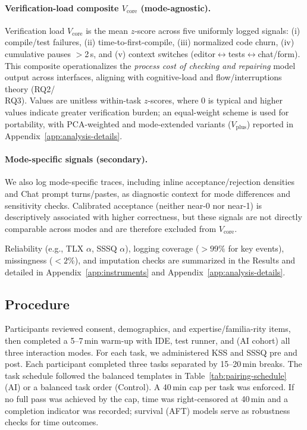 \documentclass[sigconf]{acmart}
\begin{document}
\paragraph{Verification-load composite $V_{\text{core}}$ (mode-agnostic).}
Verification load $V_{\text{core}}$ is the mean $z$-score across five uniformly logged signals: (i) compile/test failures, (ii) time-to-first-compile, (iii) normalized code churn, (iv) cumulative pauses $>$2\,s, and (v) context switches (editor$\leftrightarrow$tests$\leftrightarrow$chat/form). This composite operationalizes the \emph{process cost of checking and repairing} model output across interfaces, aligning with cognitive-load and flow/interruptions theory (RQ2/\\RQ3). Values are unitless within-task $z$-scores, where $0$ is typical and higher values indicate greater verification burden; an equal-weight scheme is used for portability, with PCA-weighted and mode-extended variants ($V_{\text{plus}}$) reported in Appendix~\ref{app:analysis-details}.

\paragraph{Mode-specific signals (secondary).}
We also log mode-specific traces, including inline acceptance/rejection densities and Chat prompt turns/pastes, as diagnostic context for mode differences and sensitivity checks. Calibrated acceptance (neither near-0 nor near-1) is descriptively associated with higher correctness, but these signals are not directly comparable across modes and are therefore excluded from $V_{\text{core}}$.

Reliability (e.g., TLX $\alpha$, SSSQ $\alpha$), logging coverage ($>\!99\%$ for key events), missingness ($<\!2\%$), and imputation checks are summarized in the Results and detailed in Appendix~\ref{app:instruments} and Appendix~\ref{app:analysis-details}.
\subsection{Procedure}
\label{sec:procedure}

Participants reviewed consent, demographics, and expertise/familia-rity items, then completed a 5--7\,min warm-up with IDE, test runner, and (AI cohort) all three interaction modes. For each task, we administered KSS and SSSQ pre and post. Each participant completed three tasks separated by 15--20\,min breaks. The task schedule followed the balanced templates in Table~\ref{tab:pairing-schedule} (AI) or a balanced task order (Control). A 40\,min cap per task was enforced. If no full pass was achieved by the cap, time was right-censored at 40\,min and a completion indicator was recorded; survival (AFT) models serve as robustness checks for time outcomes. 
\end{document}
